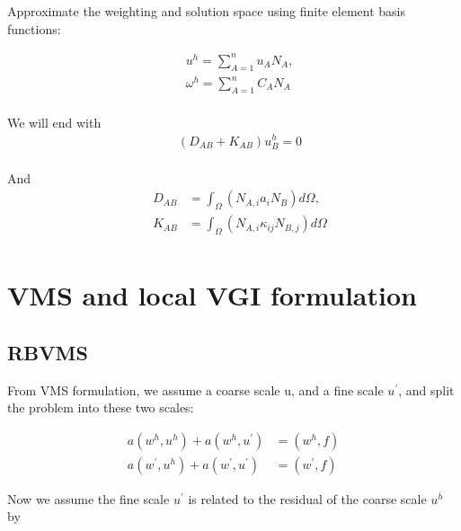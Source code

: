 \documentclass[10pt]{article}
\begin{document}
Approximate the weighting and solution space using finite element basis functions:
 
\begin{equation}
    \begin{aligned}
       \quad u^{h}  = \sum_{A = 1}^{n}u_{A}N_{A},   \\
       \quad \omega^{h}  = \sum_{A = 1}^{n}C_{A}N_{A} \\
    \end{aligned}\label{eq:3}
\end{equation}

We will end with 
\begin{equation}
    \begin{aligned}
       \quad (D_{AB} + K_{AB}) u^{h}_{B} = 0   \\\label{eq:4}
    \end{aligned}
\end{equation}

And
\begin{equation}
    \begin{aligned}
       \quad D_{AB}  &= \int_{\Omega}(N_{A,i}a_{i}N_{B})d\Omega , \\
        \quad K_{AB}  &=  \int_{\Omega}(N_{A,i}\kappa_{ij}N_{B,j})d\Omega \\
    \end{aligned}\label{eq:5}
\end{equation}


\section{VMS and local VGI formulation}
\subsection{RBVMS}
\label{solvec1}
From VMS formulation, we assume a coarse scale u, and a fine scale $u^{\prime}$, and split the problem into these two scales:

\begin{subequations}\label{eq:11}
\begin{align} 
 a(w^{h},u^{h}) + a(w^{h},u^{\prime})  &= (w^{h},f)\label{eq:11a} \\
 a(w^{\prime},u^{h}) + a(w^{\prime},u^{\prime})  &= (w^{\prime},f)\label{eq:11b} 
\end{align}
\end{subequations}


Now we assume the fine scale $u^{\prime}$ is related to the residual of the coarse scale $u^{h}$ by 
\end{document}
